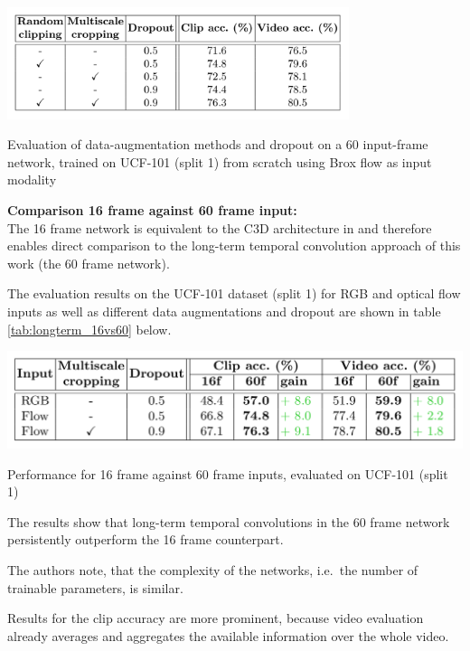 \begin{table}[H]
    \centering
    \includegraphics[width=0.75\textwidth]{img_deep/longterm_preprocessing}
    \caption{Evaluation of data-augmentation methods and dropout on a 60 input-frame network, trained on UCF-101 (split 1) from scratch using Brox flow as input modality \cite{varol_long-term_2016}}
    \label{tab:longterm_preprocessing}
\end{table}

\textbf{Comparison 16 frame against 60 frame input:}\\
The 16 frame network is equivalent to the C3D architecture in \cite{tran_learning_2015} and therefore enables direct comparison to the long-term temporal convolution approach of this work (the 60 frame network).

The evaluation results on the UCF-101 dataset (split 1) for RGB and optical flow inputs as well as different data augmentations and dropout are shown in table \ref{tab:longterm_16vs60} below.

\begin{table}[H]
    \centering
    \includegraphics[width=\textwidth]{img_deep/longterm_16vs60}
    \caption{Performance for 16 frame against 60 frame inputs, evaluated on UCF-101 (split 1) \cite{varol_long-term_2016}}
    \label{tab:longterm_16vs60}
\end{table}

The results show that long-term temporal convolutions in the 60 frame network persistently outperform the 16 frame counterpart.

The authors note, that the complexity of the networks, i.e.\ the number of trainable parameters, is similar.

Results for the clip accuracy are more prominent, because video evaluation already averages and aggregates the available information over the whole video.

